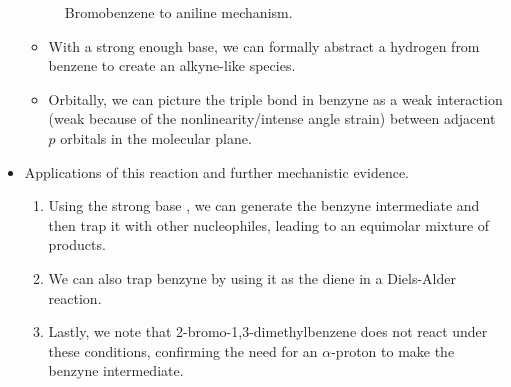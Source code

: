 \documentclass[../notes.tex]{subfiles}
\begin{document}
\begin{itemize}
\begin{figure}[h!]
        \caption{Bromobenzene to aniline mechanism.}
        \label{fig:PhBrtoPhNH2}
    \end{figure}
    \begin{itemize}
        \item With a strong enough base, we can formally abstract a hydrogen from benzene to create an alkyne-like species.
        \item Orbitally, we can picture the triple bond in benzyne as a weak interaction (weak because of the nonlinearity/intense angle strain) between adjacent $p$ orbitals in the molecular plane.
    \end{itemize}
    \item Applications of this reaction and further mechanistic evidence.
    \begin{enumerate}
        \item Using the strong base , we can generate the benzyne intermediate and then trap it with other nucleophiles, leading to an equimolar mixture of products.
        \item We can also trap benzyne by using it as the diene in a Diels-Alder reaction.
        \item Lastly, we note that 2-bromo-1,3-dimethylbenzene does not react under these conditions, confirming the need for an $\alpha$-proton to make the benzyne intermediate.
    \end{enumerate}
\end{itemize}
\end{document}
